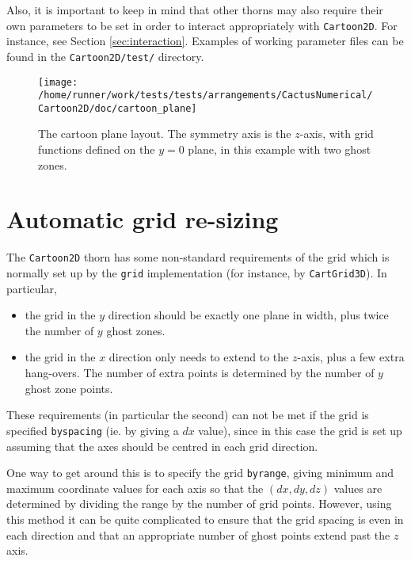 \documentclass{article}
\begin{document}
Also, it is important to keep in mind that other thorns may also
require their own parameters to be set in order to interact
appropriately with \texttt{Cartoon2D}. For instance, see Section
\ref{sec:interaction}. Examples of working parameter files can be
found in the \texttt{Cartoon2D/test/} directory.

\begin{figure}
  \centering
  \texttt{[image: /home/runner/work/tests/tests/arrangements/CactusNumerical/Cartoon2D/doc/cartoon\_plane]}
  \caption{The cartoon plane layout. The symmetry axis is the
    $z$-axis, with grid functions defined on the $y=0$ plane, in this
    example with two ghost zones.}
\end{figure}

\section{Automatic grid re-sizing}
\label{sec:regrid}

The \texttt{Cartoon2D} thorn has some non-standard requirements of the
grid which is normally set up by the \texttt{grid} implementation (for
instance, by \texttt{CartGrid3D}). In particular,

\begin{itemize}

  \item the grid in the $y$ direction should be exactly one plane in
    width, plus twice the number of $y$ ghost zones.

  \item the grid in the $x$ direction only needs to extend to the
    $z$-axis, plus a few extra hang-overs. The number of extra points
    is determined by the number of $y$ ghost zone points.

\end{itemize}

These requirements (in particular the second) can not be met if the
grid is specified \texttt{byspacing} (ie. by giving a $dx$ value),
since in this case the grid is set up assuming that the axes should be
centred in each grid direction.

One way to get around this is to specify the grid \texttt{byrange},
giving minimum and maximum coordinate values for each axis so that the
$(dx,dy,dz)$ values are determined by dividing the range by the number
of grid points. However, using this method it can be quite complicated
to ensure that the grid spacing is even in each direction and that an
appropriate number of ghost points extend past the $z$ axis.
\end{document}
